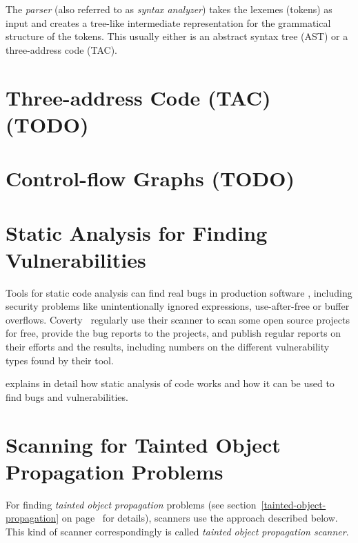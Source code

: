 The \emph{parser} (also referred to as \emph{syntax analyzer}) takes the lexemes (tokens) as input and creates a tree-like intermediate representation for the grammatical structure of the tokens. This usually either is an abstract syntax tree (AST) or a three-address code (TAC).~\cite{compilers, compiler-construction}


\section{Three-address Code (TAC) (TODO)}


\section{Control-flow Graphs (TODO)}



\section{Static Analysis for Finding Vulnerabilities}

Tools for static code analysis can find real bugs in production software \cite{findbugs, evaluating}, including security problems like unintentionally ignored expressions, use-after-free or buffer overflows. Coverty~\cite{coverity-report} regularly use their scanner to scan some open source projects for free, provide the bug reports to the projects, and publish regular reports on their efforts and the results, including numbers on the different vulnerability types found by their tool.

\cite{chess-west} explains in detail how static analysis of code works and how it can be used to find bugs and vulnerabilities.




\section{Scanning for Tainted Object Propagation Problems}
\label{tainting}

For finding \emph{tainted object propagation} problems (see section~\ref{tainted-object-propagation} on page~\pageref{tainted-object-propagation} for details), scanners use the approach described below.~\cite{finding-security-vulnerabilities, chess-west} This kind of scanner correspondingly is called \emph{tainted object propagation scanner}.

